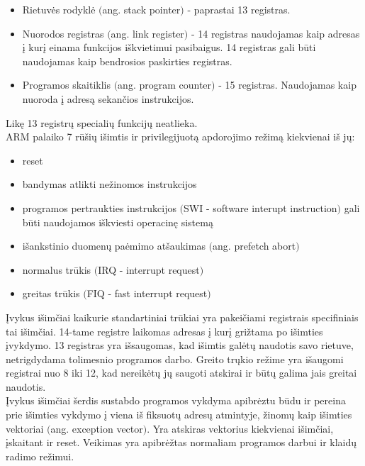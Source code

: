 \documentclass[a4paper, 12pt]{article} %
\begin{document}
\begin{onehalfspacing}
\begin{itemize}
\item Rietuv\.{e}s rodykl\.{e} $($ang. stack pointer$)$ - paprastai 13 registras.
\item Nuorodos registras $($ang. link register$)$ - 14 registras naudojamas kaip adresas \k{i} kur\k{i} einama funkcijos i\v{s}kvietimui pasibaigus. 14 registras gali b\={u}ti naudojamas kaip bendrosios paskirties registras.
\item Programos skaitiklis $($ang. program counter$)$ - 15 registras. Naudojamas kaip nuoroda \k{i} adres\k{a} sekan\v{c}ios instrukcijos. 
\end{itemize}
Lik\k{e} 13 registr\k{u} speciali\k{u} funkcij\k{u} neatlieka. \\
\indent ARM palaiko 7 r\={u}\v{s}i\k{u} i\v{s}imtis ir privilegijuot\k{a} apdorojimo re\v{z}im\k{a} kiekvienai i\v{s} j\k{u}:
\begin{itemize}
\item reset
\item bandymas atlikti ne\v{z}inomos instrukcijos
\item programos pertraukties instrukcijos $($SWI - software interupt instruction$)$ gali b\={u}ti naudojamos i\v{s}kviesti operacin\k{e} sistem\k{a}
\item i\v{s}ankstinio duomen\k{u} pa\.{e}mimo at\v{s}aukimas $($ang. prefetch abort$)$
\item normalus tr\={u}kis $($IRQ - interrupt request$)$
\item greitas tr\={u}kis $($FIQ - fast interrupt request$)$
\end{itemize}
\k{I}vykus i\v{s}im\v{c}iai kaikurie standartiniai tr\={u}kiai yra pakei\v{c}iami registrais specifiniais tai i\v{s}im\v{c}iai. 14-tame registre laikomas adresas \k{i} kur\k{i} gri\v{z}tama po i\v{s}imties \k{i}vykdymo. 13 registras yra i\v{s}saugomas, kad i\v{s}imtis gal\.{e}t\k{u} naudotis savo rietuve, netrigdydama tolimesnio programos darbo. Greito tr\k{u}kio re\v{z}ime yra i\v{s}augomi registrai nuo 8 iki 12, kad nereik\.{e}t\k{u} j\k{u} saugoti atskirai ir b\={u}t\k{u} galima jais greitai naudotis. \\
\indent \k{I}vykus i\v{s}im\v{c}iai \v{s}erdis sustabdo programos vykdyma apibr\.{e}ztu b\={u}du ir pereina prie i\v{s}imties vykdymo \k{i} viena i\v{s} fiksuot\k{u} adres\k{u} atmintyje, \v{z}inom\k{u} kaip i\v{s}imties vektoriai $($ang. exception vector$)$. Yra atskiras vektorius kiekvienai i\v{s}im\v{c}iai, \k{i}skaitant ir reset. Veikimas yra apibr\.{e}\v{z}tas normaliam programos darbui ir klaid\k{u} radimo re\v{z}imui. 


\end{onehalfspacing}
\end{document}
